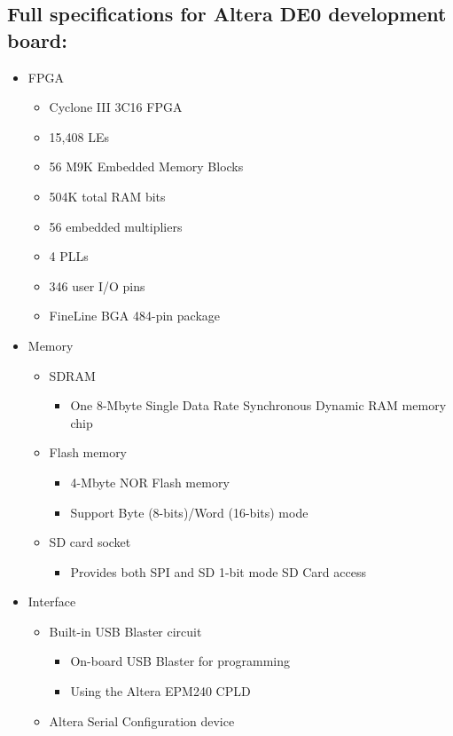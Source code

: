 \documentclass[conference]{IEEEtran}
\begin{document}
\subsection{Full specifications for Altera DE0 development board:}
\begin{itemize}
\item FPGA
	\begin{itemize}
 	\item Cyclone III 3C16 FPGA
	\item 15,408 LEs
	\item 56 M9K Embedded Memory Blocks
	\item 504K total RAM bits
	\item 56 embedded multipliers
	\item 4 PLLs
	\item 346 user I/O pins
	\item FineLine BGA 484-pin package
	\end{itemize}
\item Memory
	\begin{itemize}
	\item SDRAM
		\begin{itemize}
		\item One 8-Mbyte Single Data Rate Synchronous Dynamic RAM memory chip
		\end{itemize}
	\item Flash memory
		\begin{itemize}
		\item 4-Mbyte NOR Flash memory
		\item Support Byte (8-bits)/Word (16-bits) mode
		\end{itemize}
	\item SD card socket
		\begin{itemize}
		\item Provides both SPI and SD 1-bit mode SD Card access
		\end{itemize}
	\end{itemize}
\item Interface
	\begin{itemize}
	\item Built-in USB Blaster circuit
		\begin{itemize}
	 	\item On-board USB Blaster for programming
		\item Using the Altera EPM240 CPLD
		\end{itemize}
	\item Altera Serial Configuration device
		\begin{itemize}

\end{itemize}
\end{itemize}
\end{itemize}
\end{document}

